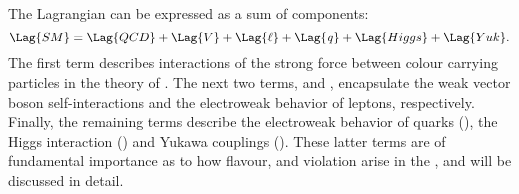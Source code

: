 The \sm Lagrangian can be expressed as a sum of components:
\begin{equation}
  \Lag{SM} = \Lag{QCD} + \Lag{V} + \Lag{\ell} + \Lag{\it q} + \Lag{Higgs} + \Lag{Yuk}.
  \label{eq:th:lag}
\end{equation}
The first term describes interactions of the strong force between colour carrying particles in the
theory of \QCD.
The next two terms,  and \Lag{\ell}, encapsulate the weak vector boson self-interactions
and the electroweak behavior of leptons, respectively.
Finally, the remaining terms describe the electroweak behavior of quarks (), the Higgs
interaction () and
Yukawa couplings ().
These latter terms are of fundamental importance as to how flavour, and \CP
violation
arise in the \sm, and will be discussed in detail.

